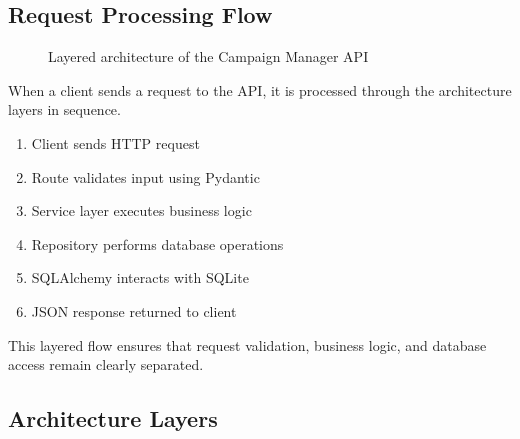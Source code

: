 \documentclass[11pt]{article}
\begin{document}
\subsection{Request Processing Flow}
\begin{minipage}{0.48\textwidth}
\centering
\begin{figure}[H]
\centering
{}
\caption{Layered architecture of the Campaign Manager API}
\end{figure}
\end{minipage}
\hfill
\begin{minipage}{0.48\textwidth}

When a client sends a request to the API, it is processed through the
architecture layers in sequence.


\begin{enumerate}
\item Client sends HTTP request
\item Route validates input using Pydantic
\item Service layer executes business logic
\item Repository performs database operations
\item SQLAlchemy interacts with SQLite
\item JSON response returned to client
\end{enumerate}
This layered flow ensures that request validation, business logic, and database access remain
clearly separated.
\end{minipage}

\subsection{Architecture Layers}
\end{document}
